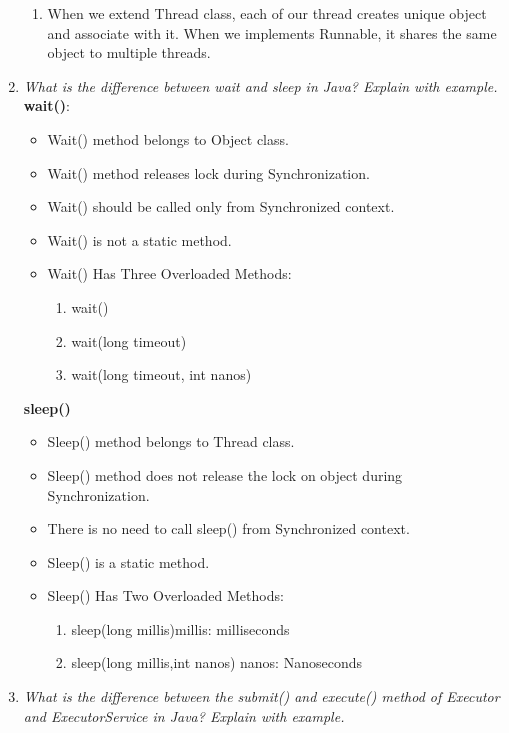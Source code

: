 \documentclass[11pt]{article}
\begin{document}
\begin{enumerate}
\begin{enumerate}
		      \item When we extend Thread class, each of our thread creates unique object and associate with it. When we implements Runnable, it shares the same object to multiple threads.
	      \end{enumerate}
	\item \textit{What is the difference between wait and sleep in Java? Explain with example.}\\
	      \textbf{wait()}:
	      \begin{itemize}
		      \item Wait() method belongs to Object class.
		      \item Wait() method releases lock during Synchronization.
		      \item Wait() should be called only from Synchronized context.
		      \item Wait() is not a static method.
		      \item Wait() Has Three Overloaded Methods:
		            \begin{enumerate}
			            \item wait()
			            \item wait(long timeout)
			            \item wait(long timeout, int nanos)
		            \end{enumerate}
	      \end{itemize}
	      \textbf{sleep()}
	      \begin{itemize}
		      \item Sleep() method belongs to Thread class.
		      \item Sleep() method does not release the lock on object during Synchronization.
		      \item There is no need to call sleep() from Synchronized context.
		      \item Sleep() is a static method.
		      \item Sleep() Has Two Overloaded Methods:
		            \begin{enumerate}
			            \item sleep(long millis)millis: milliseconds
			            \item sleep(long millis,int nanos) nanos: Nanoseconds
		            \end{enumerate}
	      \end{itemize}
	\item \textit{What is the difference between the submit() and execute() method of Executor and ExecutorService in Java? Explain with example.}\\

\end{enumerate}
\end{document}
